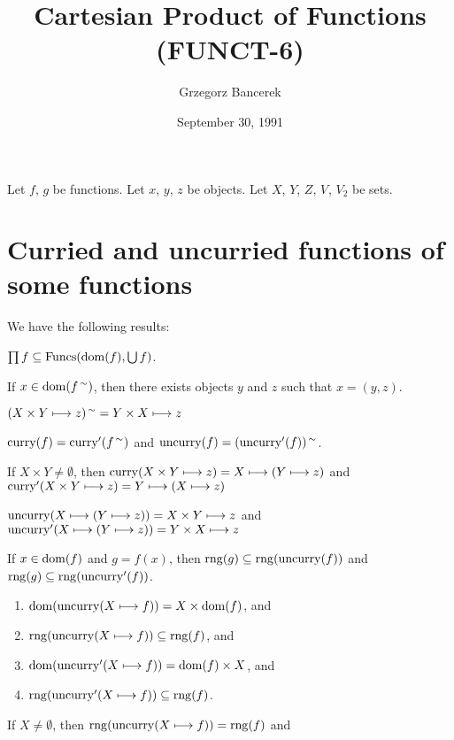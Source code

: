 \documentclass{article}
\title{Cartesian Product of Functions (FUNCT-6)}
\author{Grzegorz Bancerek}
\date{September 30, 1991}
\begin{document}
\setcounter{defni}{0}

\maketitle

Let $f$, $g$ be functions. Let $x$, $y$, $z$ be objects. Let $X$, $Y$,
$Z$, $V_{}$, $V_{2}$ be sets.

\section{Curried and uncurried functions of some functions}

We have the following results:
\begin{thm}
\item\label{funct6:1} $\prod f\subseteq\operatorname{Funcs}(\operatorname{dom}(f),\bigcup f)$.
\item\label{funct6:2} If $x\in\operatorname{dom}(f^{\,\sim})$, then there exists
  objects $y$ and $z$ such that $x=(y,z)$.
\item\label{funct6:3} $(X\times Y\longmapsto z)^{\,\sim}=Y\times X\longmapsto z$
\item\label{funct6:4} $\operatorname{curry}(f)=\operatorname{curry}'(f^{\,\sim})$ and $\operatorname{uncurry}(f)=(\operatorname{uncurry}'(f))^{\,\sim}$.
\item\label{funct6:5} If $X\times Y\neq\emptyset$,
  then $\operatorname{curry}(X\times Y\longmapsto z)=X\longmapsto(Y\longmapsto z)$
  and $\operatorname{curry}'(X\times Y\longmapsto z)=Y\longmapsto(X\longmapsto z)$
\item\label{funct6:6} $\operatorname{uncurry}(X\longmapsto(Y\longmapsto z))=X\times Y\longmapsto z$
  and $\operatorname{uncurry}'(X\longmapsto(Y\longmapsto z))=Y\times X\longmapsto z$
\item\label{funct6:7} If $x\in\operatorname{dom}(f)$ and $g=f(x)$, then
  $\operatorname{rng}(g)\subseteq\operatorname{rng}(\operatorname{uncurry}(f))$ and $\operatorname{rng}(g)\subseteq\operatorname{rng}(\operatorname{uncurry}'(f))$.
\item\label{funct6:8}
\begin{enumerate}[label=(\roman*]
\item $\operatorname{dom}(\operatorname{uncurry}(X\longmapsto f))=X\times\operatorname{dom}(f)$, and
\item $\operatorname{rng}(\operatorname{uncurry}(X\longmapsto f))\subseteq\operatorname{rng}(f)$, and
\item $\operatorname{dom}(\operatorname{uncurry}'(X\longmapsto f))=\operatorname{dom}(f)\times X$, and
\item $\operatorname{rng}(\operatorname{uncurry}'(X\longmapsto f))\subseteq\operatorname{rng}(f)$.
\end{enumerate}
\item\label{funct6:9} If $X\neq\emptyset$, then
  $\operatorname{rng}(\operatorname{uncurry}(X\longmapsto f))=\operatorname{rng}(f)$ and

\end{thm}
\end{document}

